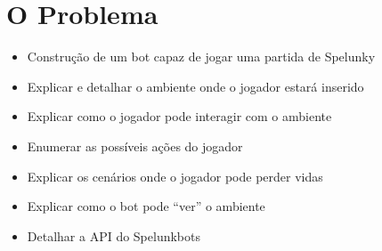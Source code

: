 \chapter{\label{chap:problem}O Problema}

\begin{itemize}
    \item Construção de um bot capaz de jogar uma partida de Spelunky
    \item Explicar e detalhar o ambiente onde o jogador estará inserido
    \item Explicar como o jogador pode interagir com o ambiente
    \item Enumerar as possíveis ações do jogador
    \item Explicar os cenários onde o jogador pode perder vidas
    \item Explicar como o bot pode ``ver'' o ambiente
    \item Detalhar a API do Spelunkbots
\end{itemize}
